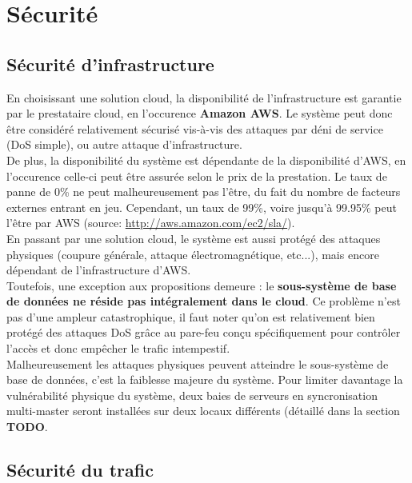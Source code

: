 \section{Sécurité}
\label{sec:securite}

\subsection{Sécurité d'infrastructure}
\label{subsec:securite-infrastructure}

En choisissant une solution cloud, la disponibilité de l'infrastructure est
garantie par le prestataire cloud, en l'occurence \textbf{Amazon AWS}. Le
système peut donc être considéré relativement sécurisé vis-à-vis des attaques
par déni de service (DoS simple), ou autre attaque d'infrastructure. \\

De plus, la disponibilité du système est dépendante de la disponibilité d'AWS,
en l'occurence celle-ci peut être assurée selon le prix de la prestation. Le
taux de panne de 0\% ne peut malheureusement pas l'être, du fait du nombre de
facteurs externes entrant en jeu. Cependant, un taux de 99\%, voire jusqu'à
99.95\% peut l'être par AWS (source: \url{http://aws.amazon.com/ec2/sla/}). \\

En passant par une solution cloud, le système est aussi protégé des attaques
physiques (coupure générale, attaque électromagnétique, etc...), mais encore
dépendant de l'infrastructure d'AWS. \\

Toutefois, une exception aux propositions demeure : le \textbf{sous-système de
base de données ne réside pas intégralement dans le cloud}. Ce problème n'est
pas d'une ampleur catastrophique, il faut noter qu'on est relativement bien
protégé des attaques DoS grâce au pare-feu conçu spécifiquement pour contrôler
l'accès et donc empêcher le trafic intempestif. \\

Malheureusement les attaques physiques peuvent atteindre le sous-système de
base de données, c'est la faiblesse majeure du système. Pour limiter davantage
la vulnérabilité physique du système, deux baies de serveurs en syncronisation
multi-master seront installées sur deux locaux différents (détaillé dans la
section {\huge \textbf{TODO}}.

\subsection{Sécurité du trafic}
\label{subsec:securite-trafic}

